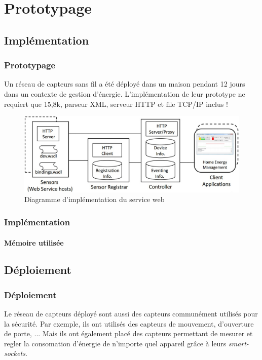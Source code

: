 \section{Prototypage}
\subsection{Implémentation}
\begin{frame}
 \frametitle{Prototypage}
 Un réseau de capteurs sans fil a été déployé dans un maison pendant 12 jours dans un contexte de gestion d'énergie.
 L'implémentation de leur prototype ne requiert que 15,8k, parseur XML, serveur HTTP et file TCP/IP inclus !
 \begin{figure}
  \centering
  \includegraphics[scale=0.36]{figures/implementation.jpg}
  \caption{Diagramme d'implémentation du service web}
 \end{figure} 
\end{frame}

\begin{frame}
 \frametitle{Implémentation}
 \framesubtitle{Mémoire utilisée}
\end{frame}


\subsection{Déploiement}
\begin{frame}
 \frametitle{Déploiement}
 Le réseau de capteurs déployé sont aussi des capteurs communément utilisés pour la sécurité.
 Par exemple, ils ont utilisés des capteurs de mouvement, d'ouverture de porte, ...
 Mais ils ont également placé des capteurs permettant de mesurer et regler la consomation d'énergie de n'importe quel appareil grâce à leurs \textit{smart-sockets}.
\end{frame}

